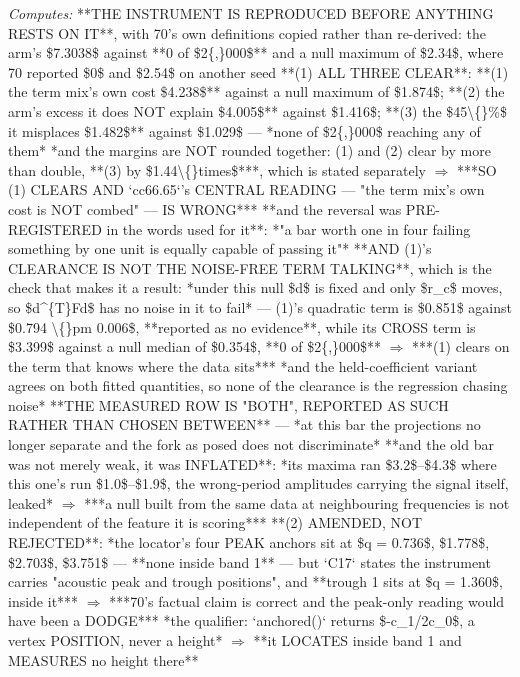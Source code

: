 \begin{description}
\emph{Computes:}  **THE INSTRUMENT IS REPRODUCED BEFORE ANYTHING RESTS ON IT**, with 70's own definitions copied rather than re-derived: the arm's \$7.3038\$ against **0 of \$2\{,\}000\$** and a null maximum of \$2.34\$, where 70 reported \$0\$ and \$2.54\$ on another seed   **(1) ALL THREE CLEAR**: **(1) the term mix's own cost \$4.238\$** against a null maximum of \$1.874\$; **(2) the arm's excess it does NOT explain \$4.005\$** against \$1.416\$; **(3) the \$45\textbackslash\{\}\%\$ it misplaces \$1.482\$** against \$1.029\$ --- *none of \$2\{,\}000\$ reaching any of them*   *and the margins are NOT rounded together: (1) and (2) clear by more than double, **(3) by \$1.44\textbackslash\{\}times\$***, which is stated separately  \ensuremath{\Rightarrow} ***SO (1) CLEARS AND `cc66.65`'s CENTRAL READING --- "the term mix's own cost is NOT combed" --- IS WRONG***   **and the reversal was PRE-REGISTERED in the words used for it**: *"a bar worth one in four failing something by one unit is equally capable of passing it"*   **AND (1)'s CLEARANCE IS NOT THE NOISE-FREE TERM TALKING**, which is the check that makes it a result: *under this null \$d\$ is fixed and only \$r\_c\$ moves, so \$d\textasciicircum{}\{T\}Fd\$ has no noise in it to fail* --- (1)'s quadratic term is \$0.851\$ against \$0.794 \textbackslash\{\}pm 0.006\$, **reported as no evidence**, while its CROSS term is \$3.399\$ against a null median of \$0.354\$, **0 of \$2\{,\}000\$**  \ensuremath{\Rightarrow} ***(1) clears on the term that knows where the data sits***   *and the held-coefficient variant agrees on both fitted quantities, so none of the clearance is the regression chasing noise*   **THE MEASURED ROW IS "BOTH", REPORTED AS SUCH RATHER THAN CHOSEN BETWEEN** --- *at this bar the projections no longer separate and the fork as posed does not discriminate*   **and the old bar was not merely weak, it was INFLATED**: *its maxima ran \$3.2\$--\$4.3\$ where this one's run \$1.0\$--\$1.9\$, the wrong-period amplitudes carrying the signal itself, leaked* \ensuremath{\Rightarrow} ***a null built from the same data at neighbouring frequencies is not independent of the feature it is scoring***   **(2) AMENDED, NOT REJECTED**: *the locator's four PEAK anchors sit at \$q = 0.736\$, \$1.778\$, \$2.703\$, \$3.751\$ --- **none inside band 1** --- but `C17` states the instrument carries "acoustic peak and trough positions", and **trough 1 sits at \$q = 1.360\$, inside it*** \ensuremath{\Rightarrow} ***70's factual claim is correct and the peak-only reading would have been a DODGE***  *the qualifier: `anchored()` returns \$-c\_1/2c\_0\$, a vertex POSITION, never a height* \ensuremath{\Rightarrow} **it LOCATES inside band 1 and MEASURES no height there**

\end{description}
